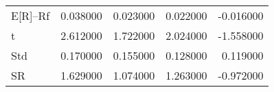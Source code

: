 \begin{tabular}{lrrrr}
\toprule
\midrule
E[R]--Rf & 0.038000 & 0.023000 & 0.022000 & -0.016000 \\
t & 2.612000 & 1.722000 & 2.024000 & -1.558000 \\
Std & 0.170000 & 0.155000 & 0.128000 & 0.119000 \\
SR & 1.629000 & 1.074000 & 1.263000 & -0.972000 \\
\bottomrule
\end{tabular}
